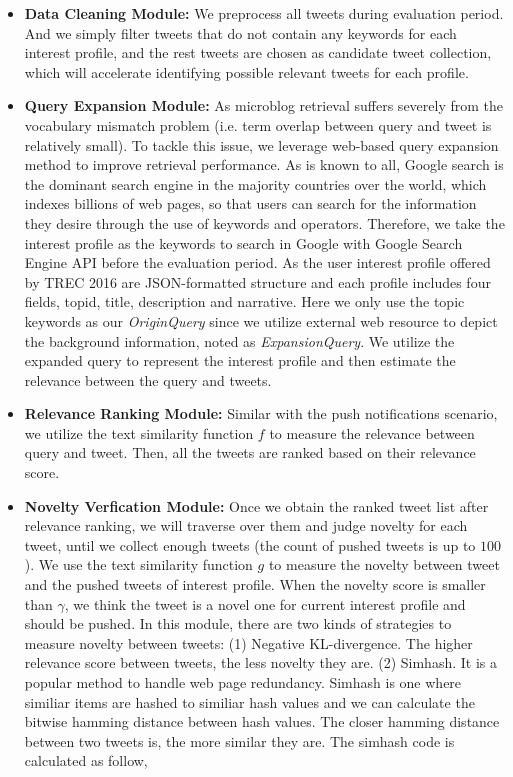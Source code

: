 \begin{itemize}
\item \textbf{Data Cleaning Module:}
We preprocess all tweets during evaluation period.
And we simply filter tweets that do not contain any keywords for each interest profile,
and the rest tweets are chosen as candidate tweet collection,
which will accelerate identifying possible relevant tweets for each profile.

\item \textbf{Query Expansion Module:}
As microblog retrieval suffers severely from the vocabulary mismatch problem
(i.e. term overlap between query and tweet is relatively small).
To tackle this issue, we leverage web-based query expansion method to improve retrieval performance.
As is known to all, Google search is the dominant search engine in the majority countries
over the world, which indexes billions\cite{arlington2008google} of web pages,
so that users can search for the information they desire through the use of keywords and operators.
Therefore, we take the interest profile as the keywords to search in Google with Google Search Engine API before the evaluation period.
As the user interest profile offered by TREC 2016 are JSON-formatted structure and each profile includes four fields, topid, title, description and narrative.
Here we only use the topic keywords as our \emph{OriginQuery} since we utilize external web resource to depict the background information, noted as \emph{ExpansionQuery}.
We utilize the expanded query to represent the interest profile and then estimate the relevance between the query and tweets.

\item \textbf{Relevance Ranking Module:}
Similar with the push notifications scenario,
we utilize the text similarity function $f$ to measure the relevance between query and tweet.
Then, all the tweets are ranked based on their relevance score.

\item \textbf{Novelty Verfication Module:}
Once we obtain the ranked tweet list after relevance ranking,
we will traverse over them and judge novelty for each tweet,
until we collect enough tweets (the count of pushed tweets is up to $100$).
We use the text similarity function $g$ to measure the novelty between tweet
and the pushed tweets of interest profile.
When the novelty score is smaller than $\gamma$,
we think the tweet is a novel one for current interest profile and should be pushed.
In this module, there are two kinds of strategies to measure novelty between tweets:
(1) Negative KL-divergence. The higher relevance score between tweets, the less novelty they are.
(2) Simhash. It is a popular method to handle web page redundancy\cite{charikar2002similarity}.
Simhash is one where similiar items are hashed to similiar hash values
and we can calculate the bitwise hamming distance between hash values.
The closer hamming distance between two tweets is, the more similar they are.
The simhash code is calculated as follow,


\end{itemize}
